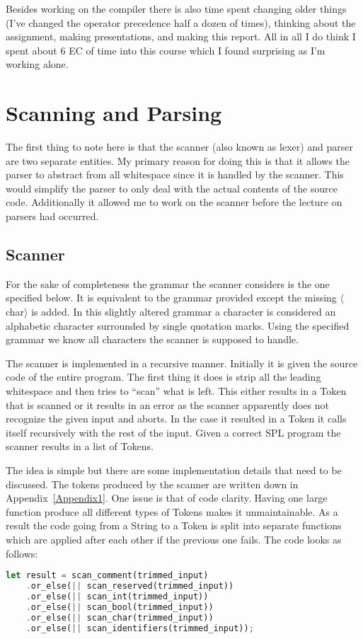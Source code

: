 \documentclass{article}
\begin{document}

Besides working on the compiler there is also time spent changing older things (I've changed the operator precedence half a dozen of times), thinking about the assignment, making presentations, and making this report. All in all I do think I spent about 6 EC of time into this course which I found surprising as I'm working alone.


\section{Scanning and Parsing}
The first thing to note here is that the scanner (also known as lexer) and parser are two separate entities. My primary reason for doing this is that it allows the parser to abstract from all whitespace since it is handled by the scanner. This would simplify the parser to only deal with the actual contents of the source code. Additionally it allowed me to work on the scanner before the lecture on parsers had occurred.

\subsection{Scanner}
For the sake of completeness the grammar the scanner considers is the one specified below. It is equivalent to the grammar provided except the missing $\langle$char$\rangle$ is added. In this slightly altered grammar a character is considered an alphabetic character surrounded by single quotation marks. Using the specified grammar we know all characters the scanner is supposed to handle.

The scanner is implemented in a recursive manner. Initially it is given the source code of the entire program. The first thing it does is strip all the leading whitespace and then tries to ``scan'' what is left. This either results in a Token that is scanned or it results in an error as the scanner apparently does not recognize the given input and aborts. In the case it resulted in a Token it calls itself recursively with the rest of the input. Given a correct SPL program the scanner results in a list of Tokens.

The idea is simple but there are some implementation details that need to be discussed. The tokens produced by the scanner are written down in Appendix~\ref{Appendix1}. One issue is that of code clarity. Having one large function produce all different types of Tokens makes it unmaintainable. As a result the code going from a String to a Token is split into separate functions which are applied after each other if the previous one fails. The code looks as follows:
\begin{lstlisting}[language=Rust, style=boxed]
let result = scan_comment(trimmed_input)
	.or_else(|| scan_reserved(trimmed_input))
	.or_else(|| scan_int(trimmed_input))
	.or_else(|| scan_bool(trimmed_input))
	.or_else(|| scan_char(trimmed_input))
	.or_else(|| scan_identifiers(trimmed_input));
\end{lstlisting}
\end{document}
